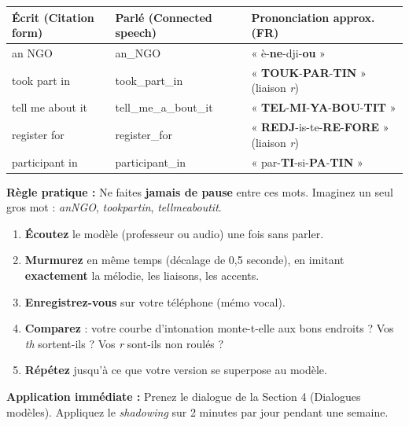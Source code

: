 \documentclass[11pt]{article}
\begin{document}
\begin{exemplebox}
\begin{center}
\begin{tabular}{|l|l|l|}
\hline
\rowcolor{popblueL} \textbf{Écrit (Citation form)} & \textbf{Parlé (Connected speech)} & \textbf{Prononciation approx. (FR)} \\
\hline
an NGO & an\_NGO & « è-\textbf{ne}-dji-\textbf{ou} » \\
\hline
took part in & took\_part\_in & « \textbf{TOUK}-\textbf{PAR}-\textbf{TIN} » (liaison \textit{r}) \\
\hline
tell me about it & tell\_me\_a\_bout\_it & « \textbf{TEL}-\textbf{MI}-\textbf{YA}-\textbf{BOU}-\textbf{TIT} » \\
\hline
register for & register\_for & « \textbf{REDJ}-is-te-\textbf{RE}-\textbf{FORE} » (liaison \textit{r}) \\
\hline
participant in & participant\_in & « par-\textbf{TI}-si-\textbf{PA}-\textbf{TIN} » \\
\hline
\end{tabular}
\end{center}
\textbf{Règle pratique :} Ne faites \textbf{jamais de pause} entre ces mots. Imaginez un seul gros mot : \textit{anNGO}, \textit{tookpartin}, \textit{tellmeaboutit}.
\end{exemplebox}

\begin{methode}
\begin{enumerate}
    \item \textbf{Écoutez} le modèle (professeur ou audio) une fois sans parler.
    \item \textbf{Murmurez} en même temps (décalage de 0,5 seconde), en imitant \textbf{exactement} la mélodie, les liaisons, les accents.
    \item \textbf{Enregistrez-vous} sur votre téléphone (mémo vocal).
    \item \textbf{Comparez} : votre courbe d'intonation monte-t-elle aux bons endroits ? Vos \textit{th} sortent-ils ? Vos \textit{r} sont-ils non roulés ?
    \item \textbf{Répétez} jusqu'à ce que votre version se superpose au modèle.
\end{enumerate}
\textbf{Application immédiate :} Prenez le dialogue de la Section 4 (Dialogues modèles). Appliquez le \textit{shadowing} sur 2 minutes par jour pendant une semaine.
\end{methode}
\end{document}

